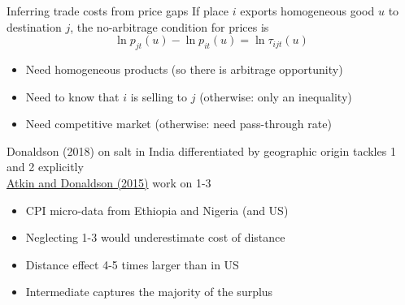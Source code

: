 \documentclass[10pt,notes=hide,aspectratio=169]{beamer}
\begin{document}
\begin{frame}{Inferring trade costs from price gaps}
If place $i$ exports homogeneous good $u$ to destination $j$, 
the no-arbitrage condition for prices is
$$\ln p_{jt}(u) -\ln p_{it}(u) = \ln \tau_{ijt}(u)$$
\vspace{-6mm}
\begin{itemize}
	\item Need homogeneous products (so there is arbitrage opportunity)
	\item Need to know that $i$ is selling to $j$ (otherwise: only an inequality)
	\item Need competitive market (otherwise: need pass-through rate)
\end{itemize}
Donaldson (2018) on salt in India differentiated by geographic origin tackles 1 and 2 explicitly\\
\href{https://www.nber.org/papers/w21439}{Atkin and Donaldson (2015)} work on 1-3
\begin{itemize}
	\item CPI micro-data from Ethiopia and Nigeria (and US)
	\item Neglecting 1-3 would underestimate cost of distance
	\item Distance effect 4-5 times larger than in US
	\item Intermediate captures the majority of the surplus
\end{itemize}
\end{frame}
\end{document}
